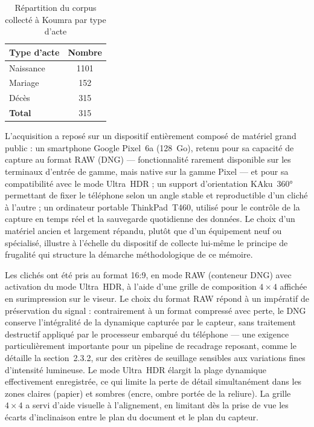 \begin{table}[H]
    \centering
    \caption{Répartition du corpus collecté à Koumra par type d'acte}
    \label{tab:repartition-corpus}
    \begin{tabular}{lc}
        \toprule
        \textbf{Type d'acte} & \textbf{Nombre} \\
        \midrule
        Naissance            & 1101            \\
        Mariage              & 152             \\
        Décès                & 315             \\
        \midrule
        \textbf{Total}       & 315             \\
        \bottomrule
    \end{tabular}
\end{table}

L'acquisition a reposé sur un dispositif entièrement composé de matériel grand public : un smartphone Google Pixel~6a (128~Go), retenu pour sa capacité de capture au format RAW (DNG) --- fonctionnalité rarement disponible sur les terminaux d'entrée de gamme, mais native sur la gamme Pixel --- et pour sa compatibilité avec le mode Ultra~HDR ; un support d'orientation \og KAku~360° \fg{} permettant de fixer le téléphone selon un angle stable et reproductible d'un cliché à l'autre ; un ordinateur portable ThinkPad~T460, utilisé pour le contrôle de la capture en temps réel et la sauvegarde quotidienne des données.
Le choix d'un matériel ancien et largement répandu, plutôt que d'un équipement neuf ou spécialisé, illustre à l'échelle du dispositif de collecte lui-même le principe de frugalité qui structure la démarche méthodologique de ce mémoire.

Les clichés ont été pris au format 16:9, en mode RAW (conteneur DNG) avec activation du mode Ultra~HDR, à l'aide d'une grille de composition $4\times4$ affichée en surimpression sur le viseur.
Le choix du format RAW répond à un impératif de préservation du signal : contrairement à un format compressé avec perte, le DNG conserve l'intégralité de la dynamique capturée par le capteur, sans traitement destructif appliqué par le processeur embarqué du téléphone --- une exigence particulièrement importante pour un pipeline de recadrage reposant, comme le détaille la section~2.3.2, sur des critères de seuillage sensibles aux variations fines d'intensité lumineuse.
Le mode Ultra~HDR élargit la plage dynamique effectivement enregistrée, ce qui limite la perte de détail simultanément dans les zones claires (papier) et sombres (encre, ombre portée de la reliure).
La grille $4\times4$ a servi d'aide visuelle à l'alignement, en limitant dès la prise de vue les écarts d'inclinaison entre le plan du document et le plan du capteur.

